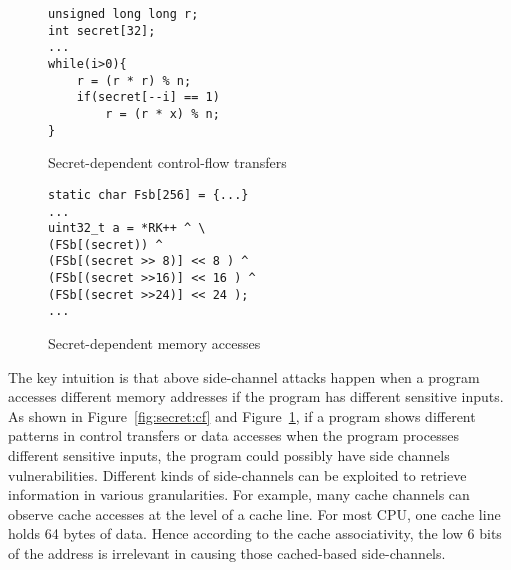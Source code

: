 \begin{figure}[]

    \noindent\begin{minipage}{0.45\linewidth}
        \noindent
        \begin{lstlisting}[numbers = none]
unsigned long long r;
int secret[32];
...
while(i>0){
    r = (r * r) % n;
    if(secret[--i] == 1)
        r = (r * x) % n;   
}
        \end{lstlisting}
\vspace*{-9pt}
        \caption{Secret-dependent control-flow transfers}
        \label{fig:secret:cf}
    \end{minipage}
    \hfill
    \begin{minipage}{0.45\linewidth}
        \begin{lstlisting}[numbers = none]
static char Fsb[256] = {...}
... 
uint32_t a = *RK++ ^ \ 
(FSb[(secret)) ^
(FSb[(secret >> 8)] << 8 ) ^
(FSb[(secret >>16)] << 16 ) ^
(FSb[(secret >>24)] << 24 );
...
        \end{lstlisting}
\vspace*{-9pt}
        \caption{Secret-dependent memory accesses}
        \label{fig:secret:da}
    \end{minipage}
\vspace*{-12pt}
\end{figure}

The key intuition is that above side-channel attacks happen when a
program accesses different memory addresses if the program has different
sensitive inputs. As shown in Figure~\ref{fig:secret:cf} and Figure~\ref{fig:secret:da}, 
if a program shows different patterns in
control transfers or data accesses when the program processes different
sensitive inputs, the program could possibly have side channels vulnerabilities.
Different kinds of side-channels can be exploited to retrieve information in
various granularities. For example, many cache channels can observe cache
accesses at the level of a cache line. For most CPU, one cache line holds 64
bytes of data. Hence according to the cache associativity, the low 6 bits of the
address is irrelevant in causing those cached-based side-channels.

%

